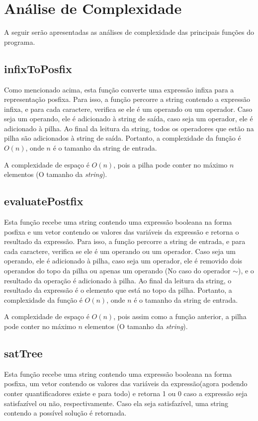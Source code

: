 \documentclass{article}
\begin{document}
\section{Análise de Complexidade}

A seguir serão apresentadas as análises de complexidade das principais funções do programa.

\subsection{infixToPosfix}
Como mencionado acima, esta função converte uma expressão infixa para a representação posfixa. Para isso, a função percorre a string contendo a expressão infixa, e para cada caractere, verifica se ele é um operando ou um operador. Caso seja um operando, ele é adicionado à string de saída, caso seja um operador, ele é adicionado à pilha. Ao final da leitura da string, todos os operadores que estão na pilha são adicionados à string de saída. Portanto, a complexidade da função é $O(n)$, onde $n$ é o tamanho da string de entrada.

A complexidade de espaço é $O(n)$, pois a pilha pode conter no máximo $n$ elementos (O tamanho da \emph{string}).

\subsection{evaluatePostfix}
Esta função recebe uma string contendo uma expressão booleana na forma posfixa e um vetor contendo os valores das variáveis da expressão e retorna o resultado da expressão. Para isso, a função percorre a string de entrada, e para cada caractere, verifica se ele é um operando ou um operador. Caso seja um operando, ele é adicionado à pilha, caso seja um operador, ele é removido dois operandos do topo da pilha ou apenas um operando (No caso do operador $\sim$), e o resultado da operação é adicionado à pilha. Ao final da leitura da string, o resultado da expressão é o elemento que está no topo da pilha. Portanto, a complexidade da função é $O(n)$, onde $n$ é o tamanho da string de entrada.

A complexidade de espaço é $O(n)$, pois assim como a função anterior, a pilha pode conter no máximo $n$ elementos (O tamanho da \emph{string}).

\subsection{satTree}
Esta função recebe uma string contendo uma expressão booleana na forma posfixa, um vetor contendo os valores das variáveis da expressão(agora podendo conter quantificadores existe e para todo) e retorna 1 ou 0 caso a expressão seja satisfazível ou não, respectivamente. Caso ela seja satisfazível, uma string contendo a possível solução é retornada. 
\end{document}
